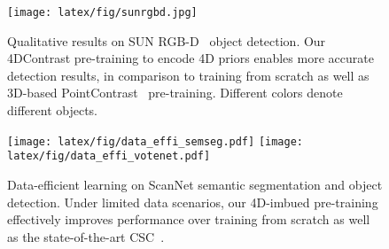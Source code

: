 \documentclass[runningheads]{llncs}
\newcommand{\OURS}{4DContrast}
\begin{document}
\begin{table}[t]
  \centering
  \caption{3D object detection on SUN RGB-D. Our 4D-based pre-training learns effective 3D representations, improving performance over training from scratch and state-of-the-art 3D pre-training methods.~indicates  that PointNet++ is used as a backbone instead of a 3D U-Net.}
  \vspace{-0.1cm}
  \vspace{-0.1in}
  \label{tab:det_sunrgbd}
\end{table}

\begin{figure}[thbp]
  \centering
   \texttt{[image: latex/fig/sunrgbd.jpg]}
   \vspace{-0.1cm}
   \caption{ Qualitative results on SUN RGB-D~\cite{song2015sun} object detection. 
   Our \OURS{} pre-training to encode 4D priors enables more accurate detection results, in comparison to training from scratch as well as 3D-based PointContrast~\cite{xie2020pointcontrast} pre-training.
   Different colors denote different objects.
   }
   \label{fig:det_sunrgbd}
\end{figure}

\begin{figure}[tbh]
    \centering
    \texttt{[image: latex/fig/data\_effi\_semseg.pdf]}
    \texttt{[image: latex/fig/data\_effi\_votenet.pdf]}
    \caption{Data-efficient learning on ScanNet semantic segmentation and object detection.
    Under limited data scenarios, our 4D-imbued pre-training effectively improves performance over training from scratch as well as the state-of-the-art CSC~\cite{hou2021exploring}.}
    \label{fig:effi_scannet}
    \vspace{-0.1in}
\end{figure}
\end{document}

